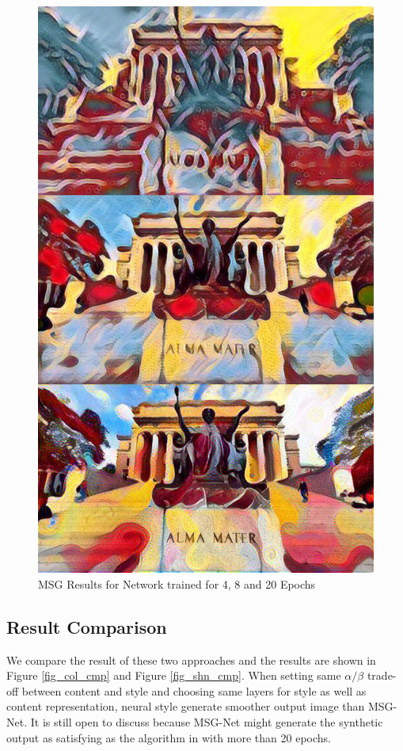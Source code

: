 \documentclass[10pt,twocolumn,letterpaper]{article}
\begin{document}
\begin{figure}[t]
\begin{center}
\includegraphics[width=0.6\linewidth]{images/msg_epoch_combine.jpg}
\end{center}
\caption{MSG Results for Network trained for 4, 8 and 20 Epochs}
\label{fig:long}
\label{fig:onecol}
\label{fig_msg}
\end{figure}

\subsection{Result Comparison}

We compare the result of these two approaches and the results are shown in Figure \ref{fig_col_cmp} and Figure \ref{fig_shn_cmp}. When setting same $\alpha / \beta$ trade-off between content and style and choosing same layers for style as well as content representation, neural style generate smoother output image than MSG-Net. It is still open to discuss because MSG-Net might generate the synthetic output as satisfying as the algorithm in \cite{Authors01} with more than 20 epochs.
\end{document}
